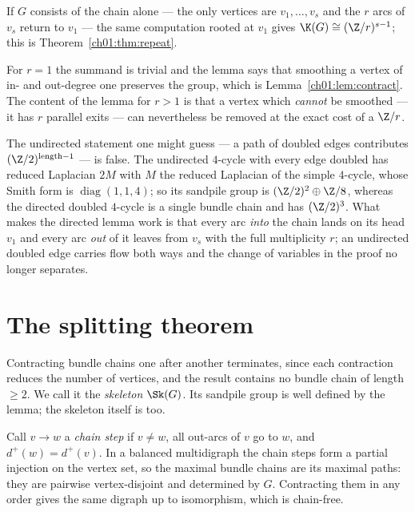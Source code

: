 If $G$ consists of the chain alone --- the only vertices are $v_1,\dots,v_s$ and the $r$
arcs of $v_s$ return to $v_1$ --- the same computation rooted at $v_1$ gives
$\K(G)\cong(\Z/r)^{s-1}$; this is Theorem~\ref{ch01:thm:repeat}.

\begin{remark}\label{ch03:rem:r1}
For $r=1$ the summand is trivial and the lemma says that smoothing a vertex of in- and
out-degree one preserves the group, which is Lemma~\ref{ch01:lem:contract}. The content of the
lemma for $r>1$ is that a vertex which \emph{cannot} be smoothed --- it has $r$ parallel
exits --- can nevertheless be removed at the exact cost of a $\Z/r$.
\end{remark}

\begin{remark}\label{ch03:rem:undirected}
The undirected statement one might guess --- a path of doubled edges contributes
$(\Z/2)^{\text{length}-1}$ --- is false. The undirected $4$-cycle with every edge doubled
has reduced Laplacian $2M$ with $M$ the reduced Laplacian of the simple $4$-cycle, whose
Smith form is $\operatorname{diag}(1,1,4)$; so its sandpile group is
$(\Z/2)^{2}\oplus\Z/8$, whereas the directed doubled $4$-cycle is a single bundle chain and
has $(\Z/2)^{3}$. What makes the directed lemma work is that every arc \emph{into} the
chain lands on its head $v_1$ and every arc \emph{out} of it leaves from $v_s$ with the
full multiplicity $r$; an undirected doubled edge carries flow both ways and the change
of variables in the proof no longer separates.
\end{remark}

\section{The splitting theorem}\label{ch03:sec:split}

Contracting bundle chains one after another terminates, since each contraction reduces
the number of vertices, and the result contains no bundle chain of length $\ge2$. We call
it the \emph{skeleton} $\Sk(G)$. Its sandpile group is well defined by the lemma; the
skeleton itself is too.

\begin{lemma}\label{ch03:lem:canon}
Call $v\to w$ a \emph{chain step} if $v\ne w$, all out-arcs of $v$ go to $w$, and
$d^+(w)=d^+(v)$. In a balanced multidigraph the chain steps form a partial injection on
the vertex set, so the maximal bundle chains are its maximal paths: they are pairwise
vertex-disjoint and determined by $G$. Contracting them in any order gives the same
digraph up to isomorphism, which is chain-free.
\end{lemma}


